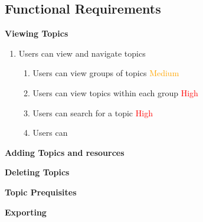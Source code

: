 \subsection{Functional Requirements}

\textbf{Viewing Topics}
\begin{enumerate}
\item Users can view and navigate topics
    \begin{enumerate}
    \item Users can view groups of topics \textcolor{Orange}{Medium}
    \item Users can view topics within each group \textcolor{Red}{High}
    \item Users can search for a topic \textcolor{Red}{High}
    \item Users can 
    \end{enumerate}
\end{enumerate}

\textbf{Adding Topics and resources}

\textbf{Deleting Topics}

\textbf{Topic Prequisites}

\textbf{Exporting}
